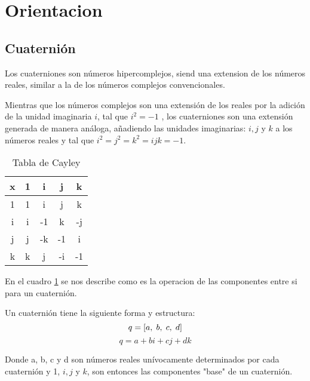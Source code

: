 
\section{Orientacion}

    \subsection{Cuaternión}
        Los cuaterniones son números hipercomplejos, siend una extension de los números reales, similar a la de los números complejos convencionales.
        
        Mientras que los números complejos son una extensión de los reales por la adición de la unidad imaginaria \textbf{$ i $}, tal que \textbf{$ i^2 = -1 $}
        , los cuaterniones son una extensión generada de manera análoga, añadiendo las unidades imaginarias: $i, j$ y $ k $ a los números reales 
        y tal que $ i^2 = j^2 = k^2 = ijk = -1$.

            \begin{table}[htp]
                \centering
                    \begin{tabular}{|c|c|c|c|c|}
                        \hline
                        \textbf{x} & 1 & i  & j  & k \\ \hline
                             1 & 1 & i  & j  & k \\ \hline
                             i & i & -1 & k  & -j \\ \hline
                             j & j & -k & -1 & i \\ \hline
                             k & k & j  & -i & -1 \\ 
                        \hline
                    \end{tabular}
                \caption{Tabla de Cayley}
                \label{table: Cayley}
            \end{table}

        En el cuadro \ref{table: Cayley} se nos describe como es la operacion de las componentes entre si para un cuaternión.

        Un cuaternión tiene la siguiente forma y estructura:
        $$ q = [a, \hspace{1mm} b, \hspace{1mm} c, \hspace{1mm} d]$$
        $$ q = a + bi +cj + dk $$

        Donde a, b, c y d son números reales unívocamente determinados por cada cuaternión y 
        1, $ i, j $ y $ k $, son entonces las componentes "base" de un cuaternión.

